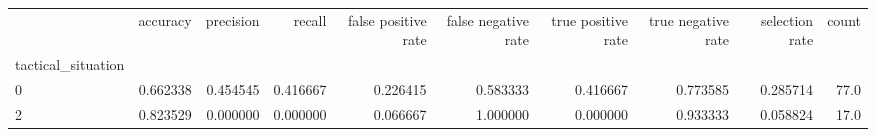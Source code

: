 \begin{tabular}{lrrrrrrrrr}
\toprule
{} &  accuracy &  precision &    recall &  false positive rate &  false negative rate &  true positive rate &  true negative rate &  selection rate &  count \\
tactical\_situation &           &            &           &                      &                      &                     &                     &                 &        \\
\midrule
0                  &  0.662338 &   0.454545 &  0.416667 &             0.226415 &             0.583333 &            0.416667 &            0.773585 &        0.285714 &   77.0 \\
2                  &  0.823529 &   0.000000 &  0.000000 &             0.066667 &             1.000000 &            0.000000 &            0.933333 &        0.058824 &   17.0 \\
\bottomrule
\end{tabular}
